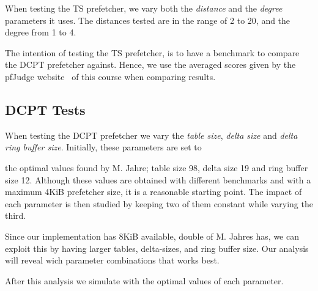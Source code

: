 When testing the TS prefetcher, we vary both the \emph{distance} and the
\emph{degree} parameters it uses. The distances tested are in the range of 2 to
20, and the degree from 1 to 4.

The intention of testing the TS prefetcher, is to have a benchmark to compare
the DCPT prefetcher against. Hence, we use the averaged scores given by the
pfJudge website~\cite[Sec.~2.5]{guidelines} of this course when comparing
results.

\subsection{DCPT Tests}

When testing the DCPT prefetcher we vary the \emph{table size}, \emph{delta
size} and \emph{delta ring buffer size}. Initially, these parameters are set to

the optimal values found by
M. Jahre\cite{dcpt}; table size 98, delta size 19 and ring buffer size 12.
Although these values are obtained with different benchmarks and with a maximum
4KiB prefetcher size, it is a reasonable starting point. The impact of each
parameter is then studied by keeping two of them constant while varying the
third.

Since our implementation has 8KiB available, double of
M. Jahres \cite{dcpt}
has, we can exploit this by having larger tables, delta-sizes, and ring buffer
size. Our analysis will reveal wich parameter combinations that works best.

After this analysis we simulate with the optimal values of each parameter.

